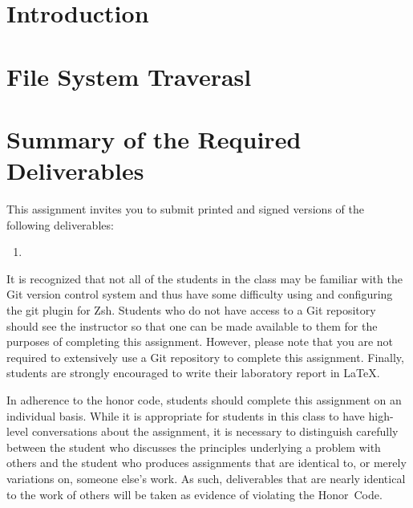 

\usepackage[compact]{titlesec}



\section*{Introduction}


  

\section*{File System Traverasl}

\section*{Summary of the Required Deliverables}

  This assignment invites you to submit printed and signed versions of the following deliverables: 

  \begin{enumerate}
    \item 
  \end{enumerate}

  It is recognized that not all of the students in the class may be familiar with the Git version control system and thus have some
  difficulty using and configuring the git plugin for Zsh.  Students who do not have access to a Git repository should see the
  instructor so that one can be made available to them for the purposes of completing this assignment. However, please note that you
  are not required to extensively use a Git repository to complete this assignment. Finally, students are strongly encouraged to
  write their laboratory report in \LaTeX.

  In adherence to the honor code, students should complete this assignment on an individual basis. While it is appropriate for
  students in this class to have high-level conversations about the assignment, it is necessary to distinguish carefully between the
  student who discusses the principles underlying a problem with others and the student who produces assignments that are identical
  to, or merely variations on, someone else's work.  As such, deliverables that are nearly identical to the work of others will be
  taken as evidence of violating the \mbox{Honor Code}.  



  
